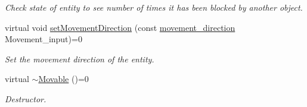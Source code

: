 \begin{DoxyCompactItemize}
\begin{DoxyCompactList}\small\item\em Check state of entity to see number of times it has been blocked by another object. \end{DoxyCompactList}\item 
\hypertarget{class_movable_a0bb485f10776845305a683ed5e2ba1fc}{virtual void \hyperlink{class_movable_a0bb485f10776845305a683ed5e2ba1fc}{set\+Movement\+Direction} (const \hyperlink{_structures_8h_a0d0b88f27f3adf9452879b5d9f829026}{movement\+\_\+direction} Movement\+\_\+input)=0}\label{class_movable_a0bb485f10776845305a683ed5e2ba1fc}

\begin{DoxyCompactList}\small\item\em Set the movement direction of the entity. \end{DoxyCompactList}\item 
\hypertarget{class_movable_ae629c22458180741deb4b67b9523c794}{virtual \hyperlink{class_movable_ae629c22458180741deb4b67b9523c794}{$\sim$\+Movable} ()=0}\label{class_movable_ae629c22458180741deb4b67b9523c794}

\begin{DoxyCompactList}\small\item\em Destructor. \end{DoxyCompactList}\end{DoxyCompactItemize}

